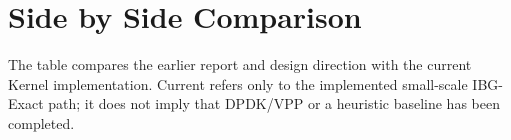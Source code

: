 \documentclass[12pt,a4paper]{article}
\begin{document}
\section{Side by Side Comparison}
\begin{tcolorbox}[colback=blue!5!white,colframe=blue!50!black,title=Important Note]
The table compares the earlier report and design direction with the current Kernel implementation. Current refers only to the implemented small-scale IBG-Exact path; it does not imply that DPDK/VPP or a heuristic baseline has been completed.
\end{tcolorbox}

\end{document}
